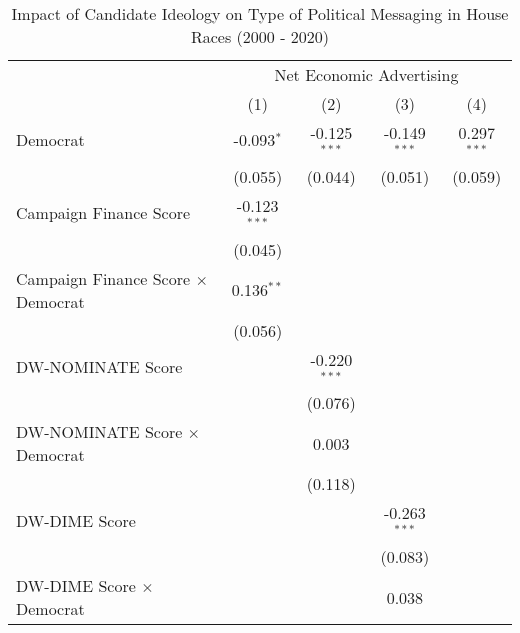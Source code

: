 
\begin{table}[htbp]
   \caption{Impact of Candidate Ideology on Type of Political Messaging in House Races (2000 - 2020)}
   \bigskip
   \centering
   \small
   \begin{tabular}{lcccc}
      \toprule
       & \multicolumn{4}{c}{Net Economic Advertising}\\
                                                                & (1)            & (2)            & (3)            & (4)\\  
      \midrule 
      Democrat                                                  & -0.093$^{*}$   & -0.125$^{***}$ & -0.149$^{***}$ & 0.297$^{***}$\\   
                                                                & (0.055)        & (0.044)        & (0.051)        & (0.059)\\   
      Campaign Finance Score                                    & -0.123$^{***}$ &                &                &   \\   
                                                                & (0.045)        &                &                &   \\   
      Campaign Finance Score $\times$ Democrat                  & 0.136$^{**}$   &                &                &   \\   
                                                                & (0.056)        &                &                &   \\   
      DW-NOMINATE Score                                         &                & -0.220$^{***}$ &                &   \\   
                                                                &                & (0.076)        &                &   \\   
      DW-NOMINATE Score $\times$ Democrat                       &                & 0.003          &                &   \\   
                                                                &                & (0.118)        &                &   \\   
      DW-DIME Score                                             &                &                & -0.263$^{***}$ &   \\   
                                                                &                &                & (0.083)        &   \\   
      DW-DIME Score $\times$ Democrat                           &                &                & 0.038          &   \\   

\end{tabular}
\end{table}
